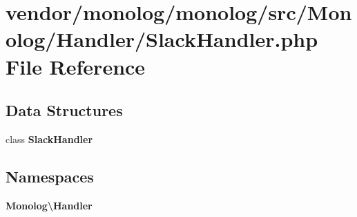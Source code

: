 \section{vendor/monolog/monolog/src/\+Monolog/\+Handler/\+Slack\+Handler.php File Reference}
\label{_slack_handler_8php}
\subsection*{Data Structures}
\begin{DoxyCompactItemize}
\item 
class {\bf Slack\+Handler}
\end{DoxyCompactItemize}
\subsection*{Namespaces}
\begin{DoxyCompactItemize}
\item 
 {\bf Monolog\textbackslash{}\+Handler}
\end{DoxyCompactItemize}
